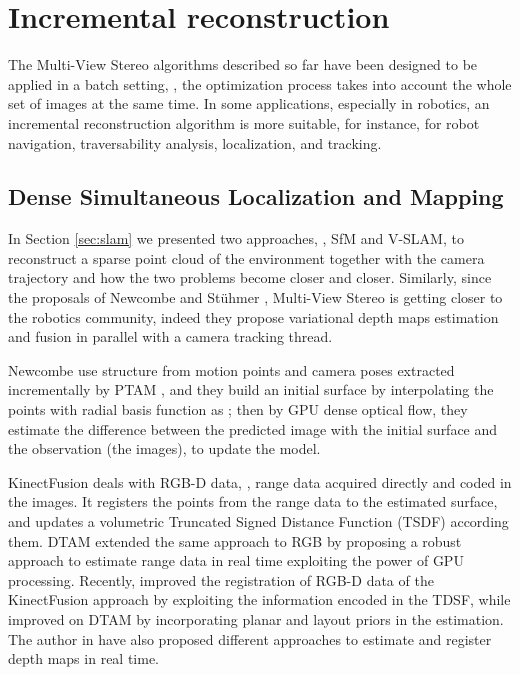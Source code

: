 \section{Incremental reconstruction} 
\label{sec:incr}
The Multi-View Stereo algorithms described so far have been designed to be applied in a batch setting, \ie, the optimization process takes into account the whole set of images at the same time.
In some applications, especially in robotics, an incremental reconstruction algorithm is more suitable, for instance, for robot navigation, traversability analysis, localization, and tracking.
\subsection{Dense Simultaneous Localization and Mapping}
In Section \ref{sec:slam} we presented two approaches, \ie, SfM and V-SLAM, to reconstruct a sparse point cloud of the environment together with the camera trajectory and how the two problems become closer and closer.
Similarly, since the proposals of Newcombe \etal \cite{newcombe2010live,newcombe2011kinectfusion,newcombe2011dtam} and St{\"u}hmer \etal \cite{stuhmer2010real}, Multi-View Stereo is getting closer to the robotics community, indeed they propose variational depth maps estimation and fusion in parallel with a camera tracking thread.

Newcombe \etal \cite{newcombe2010live} use structure from motion points and camera poses extracted incrementally by PTAM \cite{klein_murray07}, and they build an initial surface by interpolating the points with radial basis function as \cite{ohtake2003multi}; then by GPU dense optical flow, they estimate the difference between the predicted image with the initial surface and the observation (the images), to update the model.

KinectFusion \cite{newcombe2011kinectfusion} deals with RGB-D data, \ie, range data acquired  directly and coded in the images. It registers the points from the range data to the estimated surface, and updates  a volumetric Truncated Signed Distance Function (TSDF) according them. DTAM \cite{newcombe2011dtam} extended the same approach to RGB by proposing a robust approach to estimate range data in real time exploiting the power of GPU processing.
Recently, \cite{bylow2013real} improved the registration of RGB-D data of the KinectFusion approach by exploiting the information encoded in the TDSF, while \cite{concha2015incorporating} improved on DTAM by incorporating planar and layout priors in the estimation. The author in \cite{stuhmer2012parallel,stuckler2014multi}  have also proposed different approaches to estimate and register depth maps in real time.

